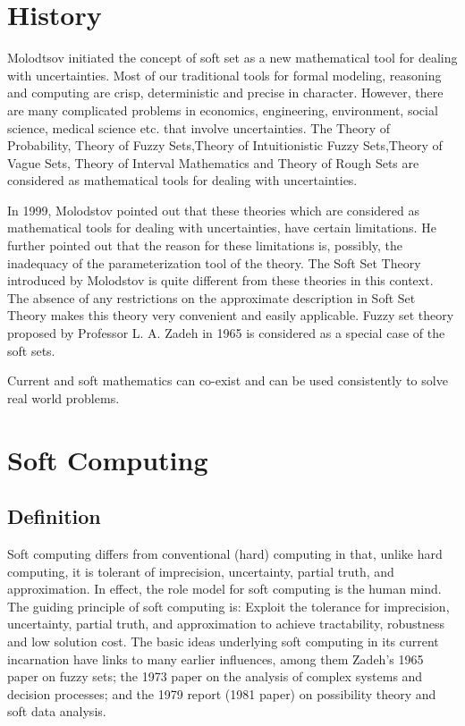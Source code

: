 \documentclass[12pt]{article} %
\begin{document}
\maketitle
\setcounter{secnumdepth}{1}

\section{History}
Molodtsov initiated the concept of soft set as a new mathematical tool for dealing with uncertainties. Most of our traditional tools for formal modeling, reasoning and computing are crisp, deterministic and precise in character. However, there are many complicated problems in economics,
engineering, environment, social science, medical science etc.
that involve uncertainties. The Theory of Probability, Theory of
Fuzzy Sets,Theory of Intuitionistic Fuzzy Sets,Theory of Vague
Sets, Theory of Interval Mathematics and Theory of Rough Sets
are considered as mathematical tools for dealing with
uncertainties.

In 1999, Molodstov pointed out that these
theories which are considered as mathematical tools for dealing
with uncertainties, have certain limitations. He further pointed
out that the reason for these limitations is, possibly, the
inadequacy of the parameterization tool of the theory. The Soft
Set Theory introduced by Molodstov is quite different from
these theories in this context. The absence of any restrictions on
the approximate description in Soft Set Theory makes this
theory very convenient and easily applicable. Fuzzy set theory
proposed by Professor L. A. Zadeh in 1965 is considered as a
special case of the soft sets.

Current and soft mathematics can
co-exist and can be used consistently to solve real
world problems.


\section{Soft Computing}
\subsection{Definition}
Soft computing differs from conventional (hard) computing in that, unlike hard computing, it is tolerant of imprecision, uncertainty, partial truth, and approximation. In effect, the role model for soft computing is the human mind. The guiding principle of soft computing is: Exploit the tolerance for imprecision, uncertainty, partial truth, and approximation to achieve tractability, robustness and low solution cost. The basic ideas underlying soft computing in its current incarnation have links to many earlier influences, among them Zadeh's 1965 paper on fuzzy sets; the 1973 paper on the analysis of complex systems and decision processes; and the 1979 report (1981 paper) on possibility theory and soft data analysis.
\end{document}
